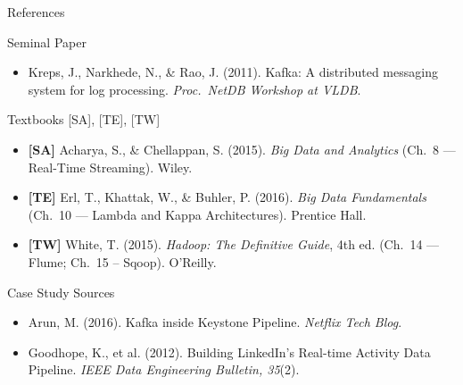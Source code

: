 \documentclass[aspectratio=169,10pt]{beamer}
\begin{document}
\begin{frame}{References}
  \begin{block}{Seminal Paper}
    \begin{itemize}
      \item Kreps, J., Narkhede, N., \& Rao, J. (2011).
            Kafka: A distributed messaging system for log processing.
            \textit{Proc.\ NetDB Workshop at VLDB}.
    \end{itemize}
  \end{block}
  \vspace{4pt}
  \begin{block}{Textbooks \textmd{[SA], [TE], [TW]}}
    \begin{itemize}
      \item \textbf{[SA]} Acharya, S., \& Chellappan, S. (2015).
            \textit{Big Data and Analytics}
            (Ch.~8 — Real-Time Streaming). Wiley.
      \item \textbf{[TE]} Erl, T., Khattak, W., \& Buhler, P. (2016).
            \textit{Big Data Fundamentals}
            (Ch.~10 — Lambda and Kappa Architectures). Prentice Hall.
      \item \textbf{[TW]} White, T. (2015).
            \textit{Hadoop: The Definitive Guide}, 4th ed.
            (Ch.~14 — Flume; Ch.~15 -- Sqoop). O'Reilly.
    \end{itemize}
  \end{block}
  \vspace{4pt}
  \begin{block}{Case Study Sources}
    \begin{itemize}
      \item Arun, M. (2016).
            Kafka inside Keystone Pipeline.
            \textit{Netflix Tech Blog}.
      \item Goodhope, K., et al. (2012).
            Building LinkedIn's Real-time Activity Data Pipeline.
            \textit{IEEE Data Engineering Bulletin, 35}(2).
    \end{itemize}
  \end{block}
\end{frame}
\end{document}
